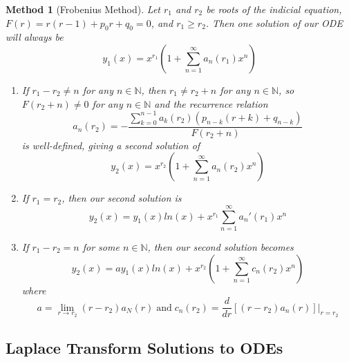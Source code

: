 \documentclass[12pt]{article}
\newtheorem{met}[thm]{Method}
\theoremstyle{definition}
\theoremstyle{remark}
\numberwithin{equation}{section}
\newcommand\N{\mathbb N}    %
\begin{document}
\begin{met}[Frobenius Method]
        Let $r_1$ and $r_2$ be roots of the indicial equation, $F(r) = r(r-1) + p_0r+q_0 = 0$, and $r_1 \geq r_2$. Then one solution of our ODE will always be \begin{equation}
                y_1(x) = x^{r_1}\left(1 + \sum\limits_{n=1}^{\infty}a_n(r_1)x^n\right)
        \end{equation}
        \begin{enumerate}
                \item If $r_1 - r_2 \neq n$ for any $n \in \N$, then $r_1 \neq r_2 + n$ for any $n \in \N$, so $F(r_2 + n) \neq 0$ for any $n \in \N$ and the recurrence relation \begin{equation}
                a_n(r_2) = -\frac{\sum\limits_{k=0}^{n-1}a_k(r_2)(p_{n-k}(r+k)+q_{n-k})}{F(r_2+n)}
                \end{equation}
                is well-defined, giving a second solution of \begin{equation}
                        y_2(x) = x^{r_2}\left(1 + \sum\limits_{n=1}^{\infty}a_n(r_2)x^n\right)
                \end{equation}
                \item If $r_1 = r_2$, then our second solution is \begin{equation}
                                y_2(x) = y_1(x)ln(x) + x^{r_1}\sum\limits_{n=1}^{\infty}a_n'(r_1)x^n                      
                        \end{equation}
                \item If $r_1 - r_2 = n$ for some $n \in \N$, then our second solution becomes \begin{equation}
                                y_2(x) = ay_1(x)ln(x) + x^{r_2}\left(1 + \sum\limits_{n=1}^{\infty}c_n(r_2)x^n\right)
                        \end{equation}
                        where \begin{equation}
                                a =\lim\limits_{r \rightarrow r_2}(r-r_2)a_N(r)\;\text{and}\;c_n(r_2)=\frac{d}{dr}\left[(r-r_2)a_n(r)\right]\bigg\rvert_{r=r_2}
                        \end{equation}
        \end{enumerate}
\end{met}

\vspace{1cm}

\subsection{Laplace Transform Solutions to ODEs}
\end{document}
